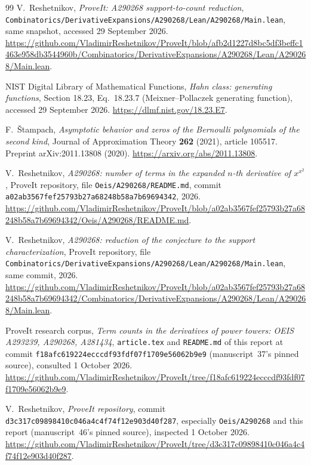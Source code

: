 \documentclass[11pt,a4paper]{article}
\numberwithin{equation}{section}
\theoremstyle{definition}
\theoremstyle{remark}
\theoremstyle{plain}
\begin{document}
\begin{thebibliography}{99}
V.~Reshetnikov, \emph{ProveIt: A290268 support-to-count reduction},
\texttt{Combinatorics/DerivativeExpansions/A290268/Lean/A290268/Main.lean},
same snapshot, accessed 29 September 2026.
\url{https://github.com/VladimirReshetnikov/ProveIt/blob/afb2d1227d8bc5df3beffc1463e958db3544960b/Combinatorics/DerivativeExpansions/A290268/Lean/A290268/Main.lean}.

NIST Digital Library of Mathematical Functions,
\emph{Hahn class: generating functions}, Section 18.23,
Eq.~18.23.7 (Meixner--Pollaczek generating function),
accessed 29 September 2026.
\url{https://dlmf.nist.gov/18.23.E7}.

F.~\v{S}tampach,
\emph{Asymptotic behavior and zeros of the Bernoulli polynomials of the
second kind}, Journal of Approximation Theory \textbf{262} (2021),
article 105517. Preprint arXiv:2011.13808 (2020).
\url{https://arxiv.org/abs/2011.13808}.

V.~Reshetnikov, \emph{A290268: number of terms in the expanded $n$-th
derivative of $x^{x^2}$}, ProveIt repository, file
\texttt{Oeis/A290268/README.md}, commit
\texttt{a02ab3567fef25793b27a68248b58a7b69694342}, 2026.
\url{https://github.com/VladimirReshetnikov/ProveIt/blob/a02ab3567fef25793b27a68248b58a7b69694342/Oeis/A290268/README.md}.

V.~Reshetnikov, \emph{A290268: reduction of the conjecture to the support
characterization}, ProveIt repository, file
\texttt{Combinatorics/DerivativeExpansions/A290268/Lean/A290268/Main.lean},
same commit, 2026.
\url{https://github.com/VladimirReshetnikov/ProveIt/blob/a02ab3567fef25793b27a68248b58a7b69694342/Combinatorics/DerivativeExpansions/A290268/Lean/A290268/Main.lean}.

ProveIt research corpus, \emph{Term counts in the derivatives of power towers:
OEIS A293239, A290268, A281434}, \texttt{article.tex} and \texttt{README.md}
of this report at commit \texttt{f18afc619224\allowbreak ecccdf93fdf07f1709e56062b9e9}
(manuscript~37's pinned source), consulted 1 October 2026.
\url{https://github.com/VladimirReshetnikov/ProveIt/tree/f18afc619224ecccdf93fdf07f1709e56062b9e9}.

V.~Reshetnikov, \emph{ProveIt repository}, commit
\texttt{d3c317c09898\allowbreak 410c046a4c4f74f12e903d40f287}, especially
\texttt{Oeis/A290268} and this report (manuscript~46's pinned source),
inspected 1 October 2026.
\url{https://github.com/VladimirReshetnikov/ProveIt/tree/d3c317c09898410c046a4c4f74f12e903d40f287}.
\end{thebibliography}
\end{document}
